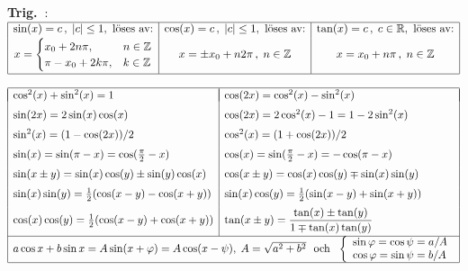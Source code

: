 \documentclass{article}
\begin{document}
\medskip
\textbf{Trig.~}:
\hbox{
$
\begin{array}[t]{|c|c|c|}
  \hline
  \sin(x)=c\,, \;|c|\leq 1,      \mbox{ löses av:} &
  \cos(x)=c\,, \;|c|\leq 1,      \mbox{ löses av:} &
  \tan(x)=c\,, \;c\in\mathbb{R}, \mbox{ löses av:}
\\[2pt]
x=
\begin{cases}
     x_0+2n\pi,   & n\in\mathbb{Z}\cr
    \pi-x_0+2k\pi,& k\in\mathbb{Z}
\end{cases}
&
x=\pm x_0+n2\pi\,,\;n\in\mathbb{Z}
&x=x_0+n\pi\,,\;n\in\mathbb{Z}
\\[11pt]
\hline
\end{array}
$} %

\medskip
$\begin{array}{|l|l|}\hline &\\*[-11pt] %
 \cos^2(x)+\sin^2(x)=1  &
 \cos(2x)=\cos^2(x)-\sin^2(x) \EndRow %
 \sin(2x)=2\sin(x)\cos(x)&\cos(2x)=2\cos^2(x)-1=1-2\sin^2(x) \EndRow
 \sin^2(x) = (1-\cos(2x))/2 &
 \cos^2(x) = (1+\cos(2x))/2 \EndRow %
 \sin(x)=\sin(\pi-x)=\cos(\frac{\pi}{2}-x) &
 \cos(x)=\sin(\frac{\pi}{2}-x)=-\cos(\pi-x)\EndRow
 \sin(x\pm y)=\sin(x)\cos(y)\pm\sin(y)\cos(x) &
 \cos(x\pm y)=\cos(x)\cos(y)\mp\sin(x)\sin(y)\EndRow
 \sin(x)\sin(y)=\frac{1}{2}(\cos(x-y)-\cos(x+y)) &
 \sin(x)\cos(y)=\frac{1}{2}(\sin(x-y)+\sin(x+y)) \EndRow
 \cos(x)\cos(y)=\frac{1}{2}(\cos(x-y)+\cos(x+y)) &
 \tan(x\pm y)=\dfrac{\tan(x)\pm\tan(y)}{1\mp\tan(x)\tan(y)}\\*[8pt]
 \cline{1-2}\multicolumn{2}{|c|}{     %
   a\cos x+b\sin x=A\sin(x+\varphi) = A\cos(x-\psi),\;
              A=\sqrt{a^2+b^2}
     \mbox{ \ och \ }
              \left\{ \begin{array}{l}
              \sin\varphi=\cos\psi=a/A \\
              \cos\varphi=\sin\psi=b/A
\end{array}\right.}
 \EndRow\hline\end{array}$ %


\subsubsection*{}%
\end{document}
